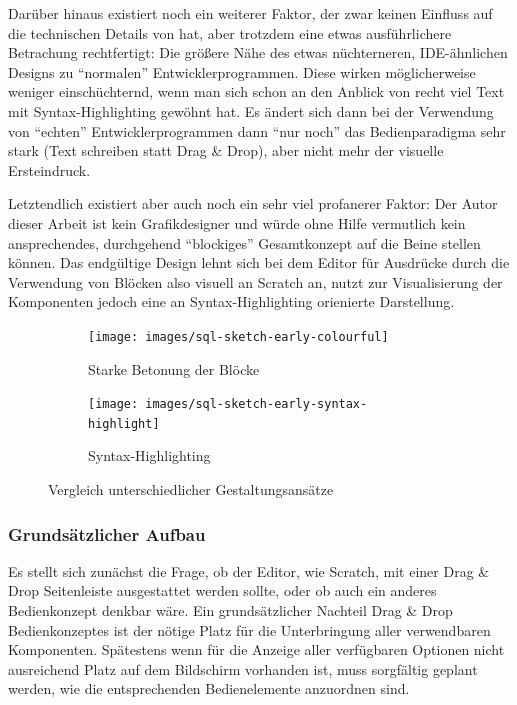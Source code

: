 Darüber hinaus existiert noch ein weiterer Faktor, der zwar keinen Einfluss auf die technischen Details von \idename{} hat, aber trotzdem eine etwas ausführlichere Betrachung rechtfertigt: Die größere Nähe des etwas nüchterneren, IDE-ähnlichen Designs zu ``normalen'' Entwicklerprogrammen. Diese wirken möglicherweise weniger einschüchternd, wenn man sich schon an den Anblick von recht viel Text mit Syntax-Highlighting gewöhnt hat. Es ändert sich dann bei der Verwendung von ``echten'' Entwicklerprogrammen dann ``nur noch'' das Bedienparadigma sehr stark (Text schreiben statt Drag \& Drop), aber nicht mehr der visuelle Ersteindruck.

Letztendlich existiert aber auch noch ein sehr viel profanerer Faktor: Der Autor dieser Arbeit ist kein Grafikdesigner und würde ohne Hilfe vermutlich kein ansprechendes, durchgehend ``blockiges'' Gesamtkonzept auf die Beine stellen können. Das endgültige Design lehnt sich bei dem Editor für Ausdrücke durch die Verwendung von Blöcken also visuell an Scratch an, nutzt zur Visualisierung der Komponenten jedoch eine an Syntax-Highlighting orienierte Darstellung.

\begin{figure}[h]
  \begin{subfigure}[b]{0.45\textwidth}
    \texttt{[image: images/sql-sketch-early-colourful]}
    \caption{Starke Betonung der Blöcke}
    \label{fig:screen-sql-editor-early-colourful}
  \end{subfigure}\hfill
  \begin{subfigure}[b]{0.45\textwidth}
    \texttt{[image: images/sql-sketch-early-syntax-highlight]}
    \caption{Syntax-Highlighting}
    \label{fig:screen-sql-editor-early-syntax-highlighting}
  \end{subfigure}
  \caption{Vergleich unterschiedlicher Gestaltungsansätze}
  \label{fig:compare-colourful}
\end{figure}

\subsubsection{Grundsätzlicher Aufbau}

Es stellt sich zunächst die Frage, ob der Editor, wie Scratch, mit einer Drag \& Drop Seitenleiste ausgestattet werden sollte, oder ob auch ein anderes Bedienkonzept denkbar wäre. Ein grundsätzlicher Nachteil Drag \& Drop Bedienkonzeptes ist der nötige Platz für die Unterbringung aller verwendbaren Komponenten. Spätestens wenn für die Anzeige aller verfügbaren Optionen nicht ausreichend Platz auf dem Bildschirm vorhanden ist, muss sorgfältig geplant werden, wie die entsprechenden Bedienelemente anzuordnen sind.

